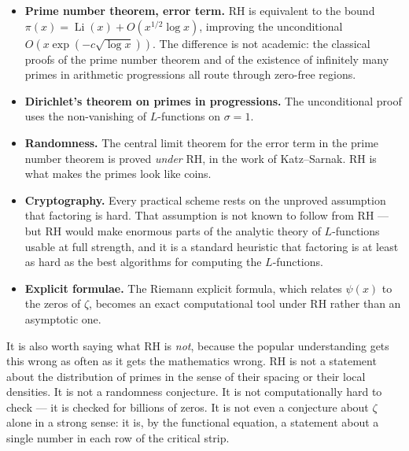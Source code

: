 \begin{itemize}
\item \textbf{Prime number theorem, error term.} RH is equivalent to the bound
$\pi(x) = \operatorname{Li}(x) + O(x^{1/2}\log x)$, improving the unconditional
$O(x \exp(-c\sqrt{\log x}))$. The difference is not academic: the classical
proofs of the prime number theorem and of the existence of infinitely many
primes in arithmetic progressions all route through zero-free regions.
\item \textbf{Dirichlet's theorem on primes in progressions.} The
unconditional proof uses the non-vanishing of $L$-functions on $\sigma = 1$.
\item \textbf{Randomness.} The central limit theorem for the error term in
the prime number theorem is proved \emph{under} RH, in the work of
Katz--Sarnak. RH is what makes the primes look like coins.
\item \textbf{Cryptography.} Every practical scheme rests on the unproved
assumption that factoring is hard. That assumption is not known to follow
from RH --- but RH would make enormous parts of the analytic theory of
$L$-functions usable at full strength, and it is a standard heuristic that
factoring is at least as hard as the best algorithms for computing the
$L$-functions.
\item \textbf{Explicit formulae.} The Riemann explicit formula, which relates
$\psi(x)$ to the zeros of $\zeta$, becomes an exact computational tool under
RH rather than an asymptotic one.
\end{itemize}

It is also worth saying what RH is \emph{not}, because the popular
understanding gets this wrong as often as it gets the mathematics wrong. RH is
not a statement about the distribution of primes in the sense of their spacing
or their local densities. It is not a randomness conjecture. It is not
computationally hard to check --- it is checked for billions of zeros. It is
not even a conjecture about $\zeta$ alone in a strong sense: it is, by the
functional equation, a statement about a single number in each row of the
critical strip.

